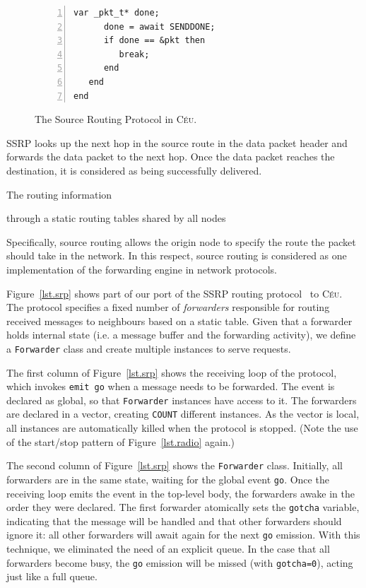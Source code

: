 \documentclass{sigplanconf}
\newcommand{\CEU}{\textsc{C\'{e}u}\xspace}
\newcommand{\code}[1] {{\small{\texttt{#1}}}}
\newcommand{\1}{\;}
\newcommand{\2}{\;\;}
\newcommand{\3}{\;\;\;}
\newcommand{\5}{\;\;\;\;\;}
\begin{document}
\begin{figure}[t]
\begin{minipage}[t]{0.30\linewidth}
\begin{lstlisting}[numbers=left,xleftmargin=2.5em]
      var _pkt_t* done;
      done = await SENDDONE;
      if done == &pkt then
         break;
      end
   end
end
\end{lstlisting}
\end{minipage}
%
\caption{ The Source Routing Protocol in \CEU.
\label{lst.apps.srp}
}
\end{figure}

 SSRP
looks up the next hop in the source route in the data packet header and
forwards the data packet to the next hop. Once the data packet reaches
the destination, it is considered as being successfully delivered.

The routing information 

 through a static routing tables shared by all nodes

Specifically, source routing allows the origin node to
specify the route the packet should take in the network. In this
respect, source routing is considered as one implementation of the
forwarding engine in network protocols.

Figure~\ref{lst.srp} shows part of our port of the SSRP routing 
protocol~\cite{wsn.teps} to \CEU.
The protocol specifies a fixed number of \emph{forwarders} responsible for 
routing received messages to neighbours based on a static table.
Given that a forwarder holds internal state (i.e. a message buffer and the 
forwarding activity), we define a \code{Forwarder} class and create multiple 
instances to serve requests.

The first column of Figure~\ref{lst.srp} shows the receiving loop of the 
protocol, which invokes \code{emit~go} when a message needs to be forwarded.
The event is declared as global, so that \code{Forwarder} instances have access 
to it.
The forwarders are declared in a vector, creating \code{COUNT} different 
instances.
As the vector is local, all instances are automatically killed when the 
protocol is stopped.
(Note the use of the start/stop pattern of Figure~\ref{lst.radio} again.)

The second column of Figure~\ref{lst.srp} shows the \code{Forwarder} class.
Initially, all forwarders are in the same state, waiting for the global event 
\code{go}.
Once the receiving loop emits the event in the top-level body, the forwarders 
awake in the order they were declared.
The first forwarder atomically sets the \code{gotcha} variable, indicating that 
the message will be handled and that other forwarders should ignore it:
all other forwarders will await again for the next \code{go} emission.
With this technique, we eliminated the need of an explicit queue.
In the case that all forwarders become busy, the \code{go} emission will be 
missed (with \code{gotcha=0}), acting just like a full queue.
\end{document}
